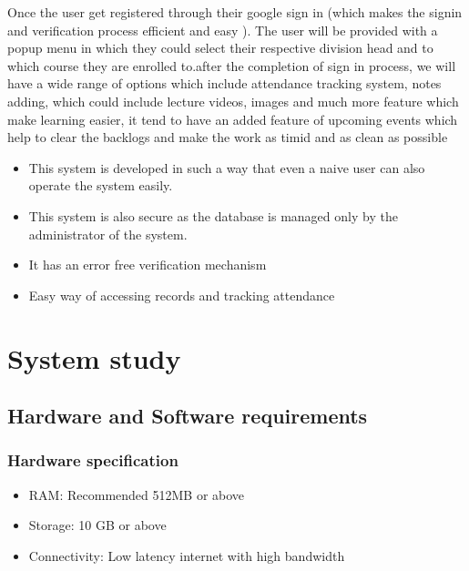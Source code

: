 \documentclass{article}
\begin{document}
\Large
Once the user get registered through their google sign in (which makes the signin and verification process efficient and easy ). The user will be provided with a popup menu in which they could select their respective division head and to which course they are enrolled to.after the completion of sign in process, we will have a wide range of options which include attendance tracking system, notes adding, which could include lecture videos, images and much more feature which make learning easier, it tend to have an added feature of upcoming events which help to clear the backlogs and make the work as timid and as clean as possible\\

\begin{itemize}
\item This system is developed in such a way that even a naive user can also operate the system easily.
\item This system is also secure as the database is managed only by
the administrator of the system.
\item It has an error free verification mechanism
\item Easy way of accessing records and tracking attendance
\end{itemize}


\newpage

\section{System study}
\vspace{1em}

\subsection{Hardware and Software requirements}
\vspace{1em}
\subsubsection{Hardware specification}
\vspace{1em}
\begin{itemize}
\item RAM: Recommended 512MB or above
\item Storage: 10 GB or above
\item Connectivity: Low latency internet with high bandwidth
\end{itemize}
\end{document}
